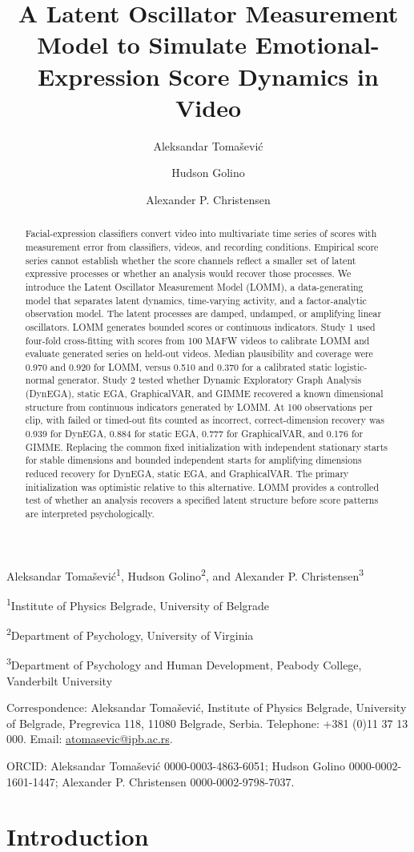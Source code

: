 \documentclass[
]{article}
\title{A Latent Oscillator Measurement Model to Simulate
Emotional-Expression Score Dynamics in Video}
\author{Aleksandar Tomašević \and Hudson Golino \and Alexander P.
Christensen}
\date{}
\makeatletter
\renewcommand{\maketitle}{%
  \begin{center}
  {\Large\bfseries \@title\par}\vspace{1em}
  Aleksandar Tomašević\textsuperscript{1}, Hudson Golino\textsuperscript{2}, and
  Alexander P. Christensen\textsuperscript{3}\par\vspace{0.5em}
  {\small
  \textsuperscript{1}Institute of Physics Belgrade, University of Belgrade\par
  \textsuperscript{2}Department of Psychology, University of Virginia\par
  \textsuperscript{3}Department of Psychology and Human Development, Peabody College, Vanderbilt University\par}
  \end{center}
  \noindent Correspondence: Aleksandar Tomašević, Institute of Physics Belgrade,
  University of Belgrade, Pregrevica 118, 11080 Belgrade, Serbia.
  Telephone: +381 (0)11 37 13 000. Email: \href{mailto:atomasevic@ipb.ac.rs}{atomasevic@ipb.ac.rs}.\par
  \noindent ORCID: Aleksandar Tomašević 0000-0003-4863-6051;
  Hudson Golino 0000-0002-1601-1447;
  Alexander P. Christensen 0000-0002-9798-7037.\par
  \vspace{1em}
}
\let\submissiontitle\maketitle
\renewcommand{\maketitle}{\submissiontitle\clearpage}
\makeatother
\begin{document}
\maketitle
\begin{abstract}
Facial-expression classifiers convert video into multivariate time
series of scores with measurement error from classifiers, videos, and
recording conditions. Empirical score series cannot establish whether
the score channels reflect a smaller set of latent expressive processes
or whether an analysis would recover those processes. We introduce the
Latent Oscillator Measurement Model (LOMM), a data-generating model that
separates latent dynamics, time-varying activity, and a factor-analytic
observation model. The latent processes are damped, undamped, or
amplifying linear oscillators. LOMM generates bounded scores or
continuous indicators. Study 1 used four-fold cross-fitting with scores
from 100 MAFW videos to calibrate LOMM and evaluate generated series on
held-out videos. Median plausibility and coverage were 0.970 and 0.920
for LOMM, versus 0.510 and 0.370 for a calibrated static logistic-normal
generator. Study 2 tested whether Dynamic Exploratory Graph Analysis
(DynEGA), static EGA, GraphicalVAR, and GIMME recovered a known
dimensional structure from continuous indicators generated by LOMM. At
100 observations per clip, with failed or timed-out fits counted as
incorrect, correct-dimension recovery was 0.939 for DynEGA, 0.884 for
static EGA, 0.777 for GraphicalVAR, and 0.176 for GIMME. Replacing the
common fixed initialization with independent stationary starts for
stable dimensions and bounded independent starts for amplifying
dimensions reduced recovery for DynEGA, static EGA, and GraphicalVAR.
The primary initialization was optimistic relative to this alternative.
LOMM provides a controlled test of whether an analysis recovers a
specified latent structure before score patterns are interpreted
psychologically.
\end{abstract}


\section{Introduction}\label{introduction}
\end{document}
